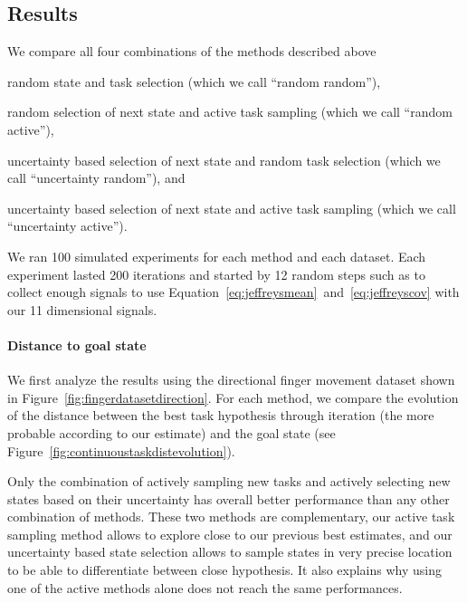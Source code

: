 \subsection{Results}

We compare all four combinations of the methods described above \begin{inparaenum}[a)] \item random state and task selection (which we call ``random random''), \item random selection of next state and active task sampling (which we call ``random active''), \item uncertainty based selection of next state and random task selection (which we call ``uncertainty random''), and \item uncertainty based selection of next state and active task sampling (which we call ``uncertainty active''). \end{inparaenum}

We ran 100 simulated experiments for each method and each dataset. Each experiment lasted 200 iterations and started by 12 random steps such as to collect enough signals to use Equation~\ref{eq:jeffreysmean}~and~\ref{eq:jeffreyscov} with our 11 dimensional signals.

\paragraph{Distance to goal state}

We first analyze the results using the directional finger movement dataset shown in Figure~\ref{fig:fingerdatasetdirection}. For each method, we compare the evolution of the distance between the best task hypothesis through iteration (the more probable according to our estimate) and the goal state (see Figure~\ref{fig:continuoustaskdistevolution}).

Only the combination of actively sampling new tasks and actively selecting new states based on their uncertainty has overall better performance than any other combination of methods. These two methods are complementary, our active task sampling method allows to explore close to our previous best estimates, and our uncertainty based state selection allows to sample states in very precise location to be able to differentiate between close hypothesis. It also explains why using one of the active methods alone does not reach the same performances.

